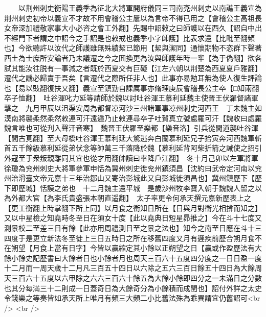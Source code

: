 　　以荆州刺史衡陽王義季為征北大將軍開府儀同三司南兗州刺史以南譙王義宣為荆州刺史初帝以義宣不才故不用會稽公主屢以為言帝不得已用之【會稽公主高祖長女帝深加禮敬家事大小必咨之會工外翻】先賜中詔敕之曰師護以在西久【詔自中出不經門下者謂之中詔今之手詔是也敕戒也義季小字師護】比表求還【比毗至翻頻也】今欲聽許以汝代之師護雖無殊績絜已節用【絜與潔同】通懷期物不恣群下聲著西土為士庶所安論者乃未議遷之今之囬換更為汝與師護年時一輩【為于偽翻】欲各試其能汝往脱有一事減之者既於西夏交有巨礙【江左六朝以荆楚為西夏夏戶雅翻】遷代之譏必歸責于吾矣【言遷代之際所任非人也】此事亦易勉耳無為使人復生評論也【易以䜴翻復扶又翻】義宣至鎮勤自課厲事亦脩理庚辰會稽長公主卒【□知兩翻卒子恤翻】　吐谷渾叱力延等請師於魏以討吐谷渾王慕利延魏主使晉王伏羅督諸軍擊之　九月甲辰以沮渠安周為都督凉河沙三州諸軍事凉州刺史河西王　丁未魏主如漠南將襲柔然柔然敕連可汗遠遁乃止敕連尋卒子吐賀真立號處羅可汗【魏收曰處羅魏言唯也可從刋入聲汗音寒】　魏晉王伏羅至樂都【樂音洛】引兵從間道襲吐谷渾【間古莧翻】至大母橋吐谷渾王慕利延大驚逃奔白蘭慕利延兄子拾寅奔河西魏軍斬首五千餘級慕利延從弟伏念等帥萬三千落降於魏【慕利延背阿柴折箭之誡使之招引外寇至于衆叛親離同其宜也從才用翻帥讀曰率降戶江翻】　冬十月己卯以左軍將軍徐瓊為兖州刺史大將軍參軍申恬為冀州刺史徙兖州鎮須昌【沈約曰武帝定河南以兖州治滑臺文帝元嘉十三年治鄒山又寄治彭城此又自彭城徙須昌也】冀州鎮歷下【歷下即歷城】恬謨之弟也　十二月魏主還平城　是歲沙州牧李寶入朝于魏魏人留之以為外都大官【為李氏貴盛張本朝直遥翻】　太子率更令何承天撰元嘉新歷表上之【更工衡翻上時掌翻下所上同】以月食之衝知日所在【日與月對衝光相揜而知之】又以中星檢之知堯時冬至日在須女十度【此以堯典日短星昴推之】今在斗十七度又測景校二至差三日有餘【此亦用周禮測日至之景之法也】知今之南至日應在斗十三四度于是更立新法冬至徙上三日五時日之所在移舊四度又月有遲疾前歷合朔月食不在朔望【月食上當有日字】今皆以贏縮定其小餘以正朔望之日【贏或作盈歷法有大餘小餘史記歷書曰大餘者日也小餘者月也周天三百六十五度四分度之一日日盈一度十二月而一周天歲十二月凡三百五十四日以六除之五六三百日餘五十四日為大餘周天三百六十五度以六甲除之六六三百六十餘五為大餘小餘即四分之一未滿日之分數也其分每滿三十二則成一日蓋奇日為大餘奇分為小餘積而成閏也】詔付外詳之太史令錢樂之等奏皆如承天所上唯月有頻三大頻二小比舊法殊為乖異謂宜仍舊詔可<br />
<br />
